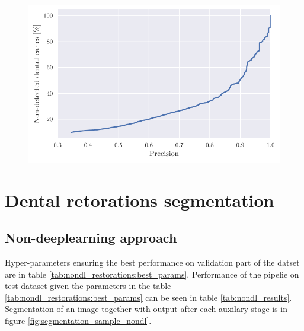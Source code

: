 \begin{figure}[H]
    \begin{floatrow}[2]
        { \includegraphics[width=\linewidth]{images/nondet_precision.pdf} }
    \end{floatrow}
\end{figure}

\section{Dental retorations segmentation}
\label{sec:dental_restoration_results}
\subsection{Non-deeplearning approach}
Hyper-parameters ensuring the best performance on validation part of the datset are in table \ref{tab:nondl_restorations:best_params}. Performance of the pipelie on test dataset given the parameters in the table \ref{tab:nondl_restorations:best_params} can be seen in table \ref{tab:nondl_results}. Segmentation of an image together with output after each auxilary stage is in figure \ref{fig:segmentation_sample_nondl}.

